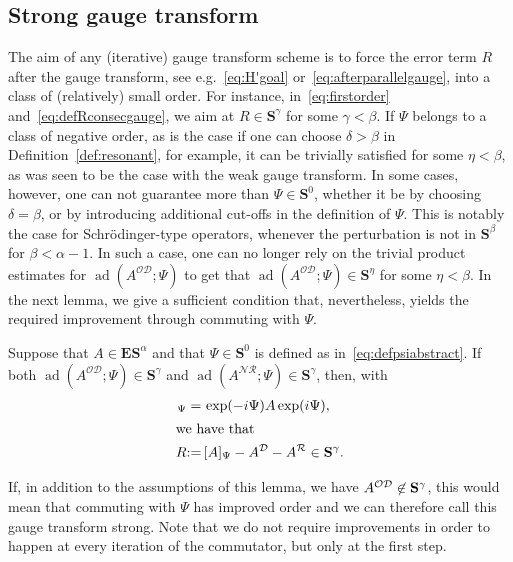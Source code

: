 \documentclass[AHL,Unicode,longabstracts,published]{cedram}
\DeclareMathOperator{\ad}{ad}
\newcommand{\CD}{\mathcal{D}}
\newcommand{\CN}{\mathcal{N}}
\newcommand{\CO}{\mathcal{O}}
\newcommand{\CR}{\mathcal{R}}
\newcommand{\COD}{{\CO\CD}}
\newcommand{\CNR}{{\CN\!\CR}}
\newcommand{\BE}{\mathbf E}
\newcommand{\BS}{\mathbf S}
\begin{document}
\subsection{Strong gauge transform} \label{sec:sgt}
The aim of any (iterative) gauge transform scheme is to force the error term $R$ after the gauge transform, see e.g.~\eqref{eq:H'goal} or~\eqref{eq:afterparallelgauge}, into a class of (relatively) small order. For instance, in~\eqref{eq:firstorder} and~\eqref{eq:defRconsecgauge}, we aim at $R \in \BS^\gamma$ for some $\gamma < \beta$. If $\Psi$ belongs to a class of negative order, as is the case if one can choose $\delta > \beta$ in Definition~\ref{def:resonant}, for example, it can be trivially satisfied for some $\eta<\beta$, as was seen to be the case with the weak gauge transform. In some cases, however, one can not guarantee more than $\Psi \in \BS^0$, whether it be by choosing $\delta = \beta$, or by introducing additional cut-offs in the definition of $\Psi$. This is notably the case for Schr\"odinger-type operators, whenever the perturbation is not in $\BS^\beta$ for $\beta < \alpha - 1$. In such a case, one can no longer rely on the trivial product estimates for $\ad(A^{\COD};\Psi)$ to get that $\ad(A^{\COD};\Psi)\in\BS^\eta$ for some $\eta<\beta$. In the next lemma, we give a sufficient condition that, nevertheless, yields the required improvement through commuting with $\Psi$.


\begin{lemm}\label{lem:sgt}
Suppose that $A \in \BE\BS^\alpha$ and that $\Psi \in \BS^0$ is defined as in~\eqref{eq:defpsiabstract}. If both $\ad(A^{\CO\CD};\Psi) \in \BS^{\gamma}$ and $\ad(A^{\CNR};\Psi) \in \BS^{\gamma}$, then, with
\begin{align*}
[A]_\Psi =&\, \exp(-i\Psi) A \exp(i\Psi),
\\
\intertext{we have that}
R {:=}&\,[A]_\Psi - A^{\CD} - A^{\CR} \in \BS^{\gamma}.
\end{align*}
\end{lemm}
\begin{rema}
If, in addition to the assumptions of this lemma, we have $A^{\CO\CD} \linebreak\not \in\BS^{\gamma}$, this would mean that commuting with $\Psi$ has improved order and we can therefore call this gauge transform strong. Note that we do not require improvements in order to happen at every iteration of the commutator, but only at the first step.
\end{rema}
\end{document}

